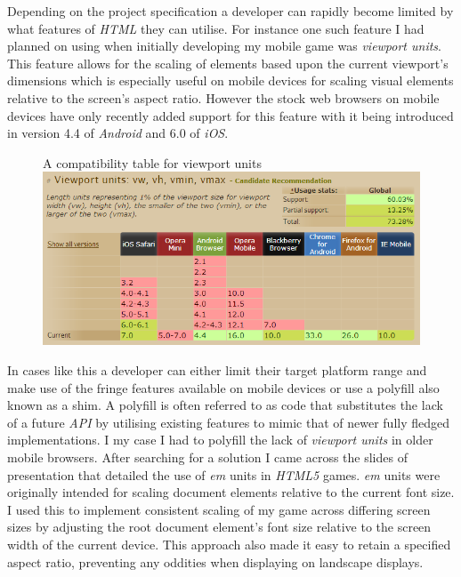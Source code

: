 \documentclass[final]{cmpreport}
\begin{document}
Depending on the project specification a developer can rapidly become limited by what features of \textit{HTML} they can utilise. For instance one such feature I had planned on using when initially developing my mobile game was \textit{viewport units}. This feature allows for the scaling of elements based upon the current viewport's dimensions which is especially useful on mobile devices for scaling visual elements relative to the screen's aspect ratio. However the stock web browsers on mobile devices have only recently added support for this feature with it being introduced in version 4.4 of \textit{Android} and 6.0 of \textit{iOS}.

\begin{figure}[h]{A compatibility table for viewport units \label{viewport}}
  \includegraphics[width=1.0\textwidth]{viewport-units.png}
\end{figure}

In cases like this a developer can either limit their target platform range and make use of the fringe features available on mobile devices or use a polyfill also known as a shim. A polyfill is often referred to as code that substitutes the lack of a future \textit{API} by utilising existing features to mimic that of newer fully fledged implementations. \cite{Lawson} I my case I had to polyfill the lack of \textit{viewport units} in older mobile browsers. After searching for a solution I came across the slides of \cite{Kadrmas} presentation that detailed the use of \textit{em} units in \textit{HTML5} games. \textit{em} units were originally intended for scaling document elements relative to the current font size. I used this to implement consistent scaling of my game across differing screen sizes by adjusting the root document element's font size relative to the screen width of the current device. This approach also made it easy to retain a specified aspect ratio, preventing any oddities when displaying on landscape displays.
\end{document}
